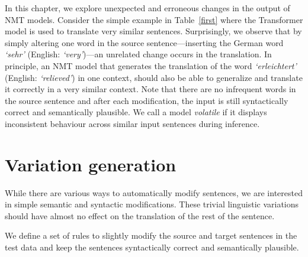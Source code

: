 In this chapter, we explore unexpected and erroneous changes in the output of NMT models.
Consider the simple example in Table~\ref{first} where the Transformer model 
is used to translate very similar sentences.
Surprisingly, we observe that by simply altering one word in the source sentence---inserting the German word \textit{`sehr'} (English: \textit{`very'})---an unrelated change occurs in the translation.
In principle, an NMT model that generates the translation of the word \textit{`erleichtert'} (English: \textit{`relieved'}) in one context, should also be able to generalize and translate it correctly in a very similar context.
Note that there are no infrequent words in the source sentence and after each modification, the input is still syntactically correct and semantically plausible.
We call a model \textit{volatile} if it displays inconsistent behaviour across similar input sentences during inference. 


\section{Variation generation}   \label{secsentvar}

While there are various ways to automatically modify sentences, we are interested in simple semantic and syntactic modifications. %
These trivial linguistic variations should have almost no effect on the translation of the rest of the sentence.


We define a set of rules to slightly modify the source and target sentences in the test data and keep the sentences syntactically correct and semantically plausible. 


